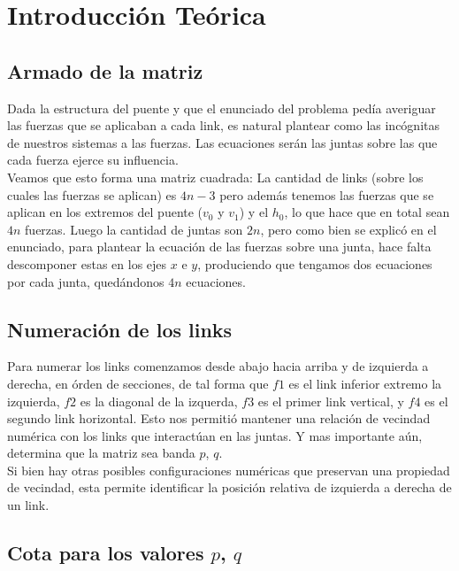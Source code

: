 \section{Introducción Teórica}

\subsection{Armado de la matriz}

Dada la estructura del puente y que el enunciado del problema pedía averiguar las fuerzas que se aplicaban a cada link, es natural plantear como las incógnitas de nuestros sistemas a las fuerzas. Las ecuaciones serán las juntas sobre las que cada fuerza ejerce su influencia.\\

Veamos que esto forma una matriz cuadrada: La cantidad de links (sobre los cuales las fuerzas se aplican) es $4n - 3$ pero además tenemos las fuerzas que se aplican en los extremos del puente ($v_0$ y $v_1$) y el $h_0$, lo que hace que en total sean $4n$ fuerzas. Luego la cantidad de juntas son $2n$, pero como bien se explicó en el enunciado, para plantear la ecuación de las fuerzas sobre una junta, hace falta descomponer estas en los ejes $x$ e $y$, produciendo que tengamos dos ecuaciones por cada junta, quedándonos $4n$ ecuaciones.\\

\subsection{Numeración de los links}

Para numerar los links comenzamos desde abajo hacia arriba y de izquierda a derecha, en órden de secciones, de tal forma que $f1$ es el link inferior extremo la izquierda, $f2$ es la diagonal de la izquerda, $f3$ es el primer link vertical, y $f4$ es el segundo link horizontal.  Esto nos permitió mantener una relación de vecindad numérica con los links que interactúan en las juntas. Y mas importante aún, determina que la matriz sea banda $p$, $q$.\\

Si bien hay otras posibles configuraciones numéricas que preservan una propiedad de vecindad, esta permite identificar la posición relativa de izquierda a derecha de un link.

\subsection{Cota para los valores $p$, $q$}

